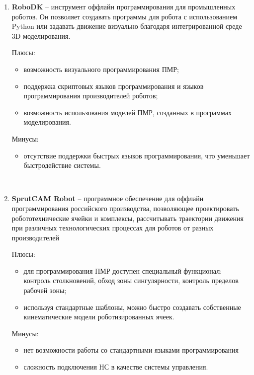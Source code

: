 \begin{enumerate}
    \item \textbf{RoboDK} \cite{soft_RoboDK} -- инструмент оффлайн программирования для промышленных роботов. Он позволяет создавать программы для робота с использованием Python или задавать движение визуально благодаря интегрированной среде 3D-моделирования.

    Плюсы:
    \begin{itemize}
        \item возможность визуального программирования ПМР;
        \item поддержка скриптовых языков программирования и языков программирования производителей роботов;
        \item возможность использования моделей ПМР, созданных в программах моделирования.
    \end{itemize}

    Минусы:
    \begin{itemize}
        \item отсутствие поддержки быстрых языков программирования, что уменьшает быстродействие системы.
    \end{itemize}

    ~

    \item \textbf{SprutCAM Robot} \cite{soft_SprutCAM} -- программное обеспечение для оффлайн программирования российского производства, позволяющее проектировать робототехнические ячейки и комплексы, рассчитывать траектории движения при различных технологических процессах для роботов от разных производителей 

    Плюсы:
    \begin{itemize}
        \item для программирования ПМР доступен специальный функционал: контроль столкновений, обход зоны сингулярности, контроль пределов рабочей зоны;
        \item используя стандартные шаблоны, можно быстро создавать собственные кинематические модели роботизированных ячеек.
    \end{itemize}

    Минусы:
    \begin{itemize}
        \item нет возможности работы со стандартными языками программирования
        \item сложность подключения НС в качестве системы управления.
    \end{itemize}
\end{enumerate}


